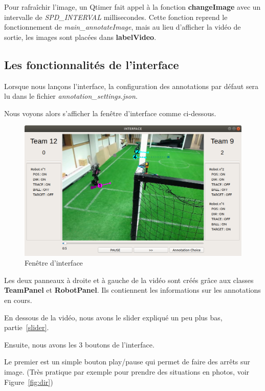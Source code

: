 \bigskip

Pour rafraîchir l'image, un Qtimer fait appel à la fonction
\textbf{changeImage} avec un intervalle de \textit{SPD\_INTERVAL}
millisecondes. Cette fonction reprend le fonctionnement de
\textit{main\_annotateImage}, mais au lieu d'afficher la vidéo de
sortie, les images sont placées dans \textbf{labelVideo}. 


\subsection{Les fonctionnalités de l'interface}

Lorsque nous lançons l'interface, la configuration des
annotations par défaut sera lu dans le fichier
\textit{annotation\_settings.json}.


Nous voyons alors s'afficher la fenêtre d'interface comme 
ci-dessous.
\newpage


\begin{figure}[h] 
\centering 
\includegraphics[scale = 0.35]{images/interface.png}
\caption{Fenêtre d'interface}
\label{fig:interface}
\end{figure}

Les deux panneaux à droite et à gauche de la vidéo sont créés
grâce aux classes \textbf{TeamPanel} et \textbf{RobotPanel}.
Ils contiennent les informations sur les annotations en cours.
\bigskip

En dessous de la vidéo, nous avons le slider expliqué un peu plus
bas, partie~\ref{slider}.
\bigskip

Ensuite, nous avons les 3 boutons de l'interface. 

Le premier est un simple bouton play/pause qui permet de faire
des arrêts sur image. (Très pratique par exemple pour prendre des
situations en photos, voir Figure~\ref{fig:dir})
\bigskip

